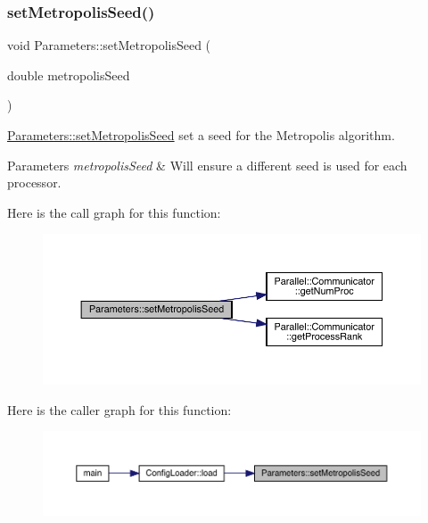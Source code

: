 \subsubsection{\texorpdfstring{setMetropolisSeed()}{setMetropolisSeed()}}
{\footnotesize\ttfamily void Parameters\+::set\+Metropolis\+Seed (\begin{DoxyParamCaption}\item[{double}]{metropolis\+Seed }\end{DoxyParamCaption})\hspace{0.3cm}{\ttfamily [static]}}



\mbox{\hyperlink{class_parameters_ace3967a0ee49901f55e9de69e0a96117}{Parameters\+::set\+Metropolis\+Seed}} set a seed for the Metropolis algorithm. 


\begin{DoxyParams}{Parameters}
{\em metropolis\+Seed} & Will ensure a different seed is used for each processor. \\
\hline
\end{DoxyParams}
Here is the call graph for this function\+:
\nopagebreak
\begin{figure}[H]
\begin{center}
\leavevmode
\includegraphics[width=350pt]{class_parameters_ace3967a0ee49901f55e9de69e0a96117_cgraph}
\end{center}
\end{figure}
Here is the caller graph for this function\+:
\nopagebreak
\begin{figure}[H]
\begin{center}
\leavevmode
\includegraphics[width=350pt]{class_parameters_ace3967a0ee49901f55e9de69e0a96117_icgraph}
\end{center}
\end{figure}
\mbox{\label{class_parameters_a0e0118ebbe8f19148a5c6d737c7a2c85}} 
